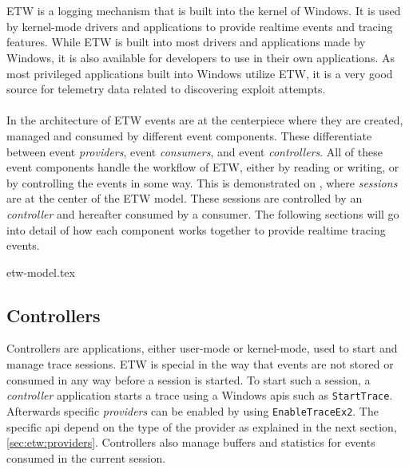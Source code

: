\documentclass{report}
\begin{document}
\section{}
\label{cha:etw}
\gls{ETW} is a logging mechanism that is built into the kernel of Windows. It is used by kernel-mode drivers and applications to provide realtime events and tracing features. While \gls{ETW} is built into most drivers and applications made by Windows, it is also available for developers to use in their own applications. As most privileged applications built into Windows utilize \gls{ETW}, it is a very good source for telemetry data related to discovering exploit attempts.
\\
\\
In the architecture of \gls{ETW} events are at the centerpiece where they are created, managed and consumed by different event components\cite{url:etw:about}. These differentiate between event \emph{providers}, event \emph{consumers}, and event \emph{controllers}. All of these event components handle the workflow of \gls{ETW}, either by reading or writing, or by controlling the events in some way. This is demonstrated on , where \emph{sessions} are at the center of the \gls{ETW} model. These sessions are controlled by an \emph{controller} and hereafter consumed by a consumer. The following sections will go into detail of how each component works together to provide realtime tracing events.

{etw-model.tex}

\subsection{Controllers}
Controllers are applications, either user-mode or kernel-mode, used to start and manage trace sessions. \gls{ETW} is special in the way that events are not stored or consumed in any way before a session is started. To start such a session, a \emph{controller} application starts a trace using a Windows \gls{api}s such as \texttt{StartTrace}. Afterwards specific \emph{providers} can be enabled by using \texttt{EnableTraceEx2}. The specific \gls{api} depend on the type of the provider as explained in the next section, \ref{sec:etw:providers}. Controllers also manage buffers and statistics for events consumed in the current session.
\end{document}
